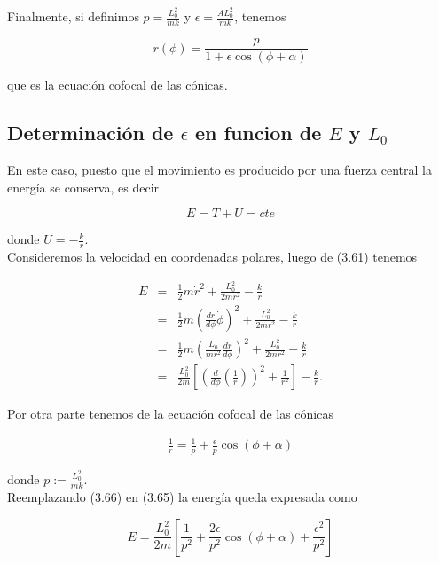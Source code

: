 \documentclass[12pt]{report}
\begin{document}
Finalmente, si definimos $p= \displaystyle \frac{L_0^2}{mk}$ y $\epsilon = \displaystyle \frac{AL_0^2}{mk}$, tenemos

\begin{equation}
r(\phi)= \displaystyle \frac{p}{1+\epsilon \cos{(\phi+\alpha)}}
\end{equation}

que es la ecuación cofocal de las cónicas.


\subsection{Determinación de  $\epsilon$ en funcion de $E$ y $L_0$}

En este caso, puesto que el movimiento es producido por una fuerza central la energía se conserva, es decir

\begin{equation}
E=T+U=cte
\end{equation}

donde $U= \displaystyle-\frac{k}{r}$. \\


Consideremos la velocidad en coordenadas polares, luego de (3.61) tenemos

\begin{eqnarray}
E &=& \frac{1}{2}m\dot{r}^2 +\frac{L_0^2}{2m r^2} - \frac{k}{r} \\
 &=& \frac{1}{2}m \left( \frac{dr}{d\phi} \dot{\phi} \right)^2 + \frac{L_0^2}{2mr^2} - \frac{k}{r} \\
 &=&  \frac{1}{2}m \left( \frac{L_0}{mr^2} \frac{dr}{d\phi} \right)^2 + \frac{L_0^2}{2mr^2} - \frac{k}{r} \\
 &=& \frac{L_0^2}{2m} \left[ \left( \frac{d}{d\phi} \left( \frac{1}{r} \right)  \right)^2 + \frac{1}{r^2} \right] - \frac{k}{r}.
\end{eqnarray}

Por otra parte tenemos de la ecuación cofocal de las cónicas 

\begin{eqnarray}
\frac{1}{r}= \frac{1}{p} + \frac{\epsilon}{p} \cos{(\phi + \alpha)}
\end{eqnarray}

donde  $p:= \displaystyle \frac{L_0^2}{mk}$. \\

Reemplazando (3.66) en (3.65) la energía queda expresada como

\begin{equation}
E=\frac{L_0^2}{2m} \left[ \frac{1}{p^2} + \frac{2\epsilon}{p^2} \cos{(\phi + \alpha)} + \frac{\epsilon^2}{p^2} \right]
\end{equation}
\end{document}
